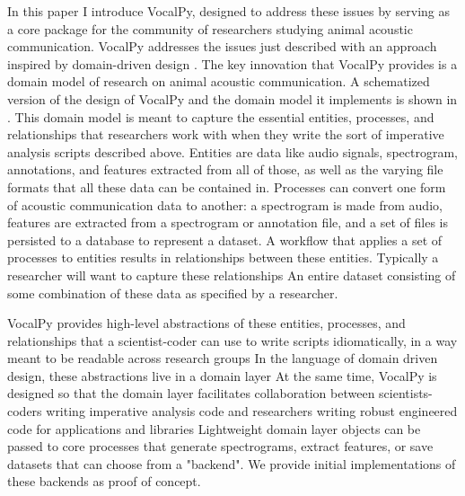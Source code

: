 \documentclass[11pt]{article}
\begin{document}
In this paper I introduce VocalPy, designed to address these issues by serving as a core package for the community of researchers studying animal acoustic communication.
VocalPy addresses the issues just described with an approach inspired by domain-driven design \cite{evansDomaindrivenDesignTackling2004, percivalArchitecturePatternsPython2020}.
The key innovation that VocalPy provides is a domain model of research on animal acoustic communication.
A schematized version of the design of VocalPy and the domain model it implements is shown in .
This domain model is meant to capture the essential entities, processes, and relationships that researchers work with when they write the sort of imperative analysis scripts described above.
Entities are data like audio signals, spectrogram, annotations, and features extracted from all of those, as well as the varying file formats that all these data can be contained in.
Processes can convert one form of acoustic communication data to another: a spectrogram is made from audio, features are extracted from a spectrogram or annotation file, and a set of files is persisted to a database to represent a dataset.
A workflow that applies a set of processes to entities results in relationships between these entities. Typically a researcher will want to capture these relationships
An entire dataset consisting of some combination of these data as specified by a researcher.

VocalPy provides high-level abstractions of these entities, processes, and relationships that a scientist-coder can use to write scripts idiomatically, in a way meant to be readable across research groups
In the language of domain driven design, these abstractions live in a domain layer
At the same time, VocalPy is designed so that the domain layer facilitates collaboration between scientists-coders writing imperative analysis code and researchers writing robust engineered code for applications and libraries
Lightweight domain layer objects can be passed to core processes that generate spectrograms, extract features, or save datasets that can choose from a "backend".
We provide initial implementations of these backends as proof of concept.
\end{document}
